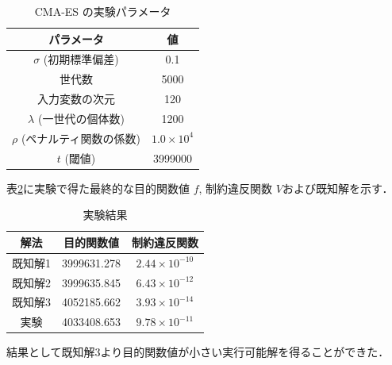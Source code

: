 \documentclass[twocolumn]{jarticle}
\begin{document}
\begin{table}[htbp]
    \begin{center}
        \caption{CMA-ES の実験パラメータ}
        \label{setting_cmaes}
        \begin{tabular}{| c | c |} 
            \hline
            パラメータ & 値 \\ 
            \hline
            $\sigma$ (初期標準偏差) &  0.1 \\
            世代数 & 5000 \\
            入力変数の次元 & 120 \\
            $\lambda$ (一世代の個体数) & 1200 \\
            $\rho$ (ペナルティ関数の係数) & $1.0\times10^{4}$\\
            $t$ (閾値) & 3999000 \\
            \hline
        \end{tabular}
    \end{center}
\end{table}

表\ref{result}に実験で得た最終的な目的関数値 $f$, 制約違反関数 $V$および既知解を示す．
\begin{table}[htbp]
    \begin{center}
        \caption{実験結果}
        \label{result}
        \begin{tabular}{|c|c|c|}
            \hline
            解法 & 目的関数値 & 制約違反関数 \\ 
            \hline
            既知解1 & 3999631.278 & $2.44 \times 10^{-10}$ \\
            既知解2 & 3999635.845 & $6.43 \times 10^{-12}$ \\
            既知解3 & 4052185.662 & $3.93 \times 10^{-14}$ \\
            実験    & 4033408.653 & $9.78 \times 10^{-11}$ \\
            \hline
        \end{tabular}
    \end{center}
\end{table}
結果として既知解3より目的関数値が小さい実行可能解を得ることができた．
\end{document}
